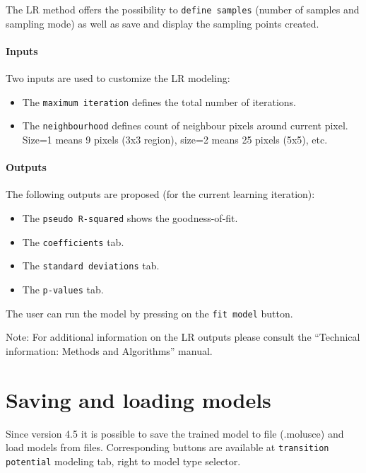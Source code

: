 \documentclass{report}
\begin{document}
The LR method offers the possibility to \verb+define samples+ (number of samples and sampling mode) as
well as save and display the sampling points created.

\paragraph{Inputs} Two inputs are used to customize the LR modeling:
\begin{itemize}
  \item The \verb+maximum iteration+ defines the total number of iterations.
  \item The \verb+neighbourhood+ defines count of neighbour pixels around current pixel. Size=1 means 9
pixels (3x3 region), size=2 means 25 pixels (5x5), etc.
\end{itemize}

\paragraph{Outputs} 

The following outputs are proposed (for the current learning iteration):

\begin{itemize}
  \item The \verb+pseudo R-squared+ shows the goodness-of-fit.
  \item The \verb+coefficients+ tab.
  \item The \verb+standard deviations+ tab.
  \item The \verb+p-values+ tab.
\end{itemize}

The user can run the model by pressing on the \verb+fit model+ button.

Note: For additional information on the LR outputs please consult the “Technical information:
Methods and Algorithms” manual.

\section{Saving and loading models}

Since version 4.5 it is possible to save the trained model to file (.molusce) and load models from files. Corresponding buttons are available at \verb+transition potential+ modeling tab, right to model type selector.
\end{document}
